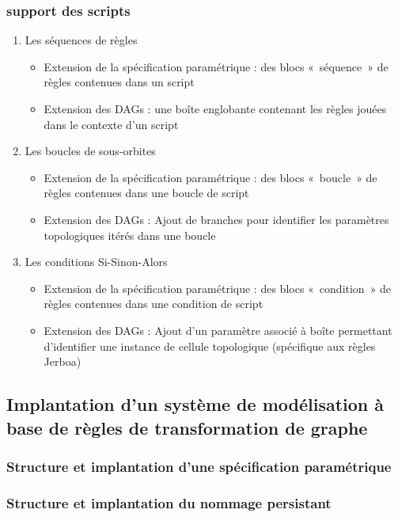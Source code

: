 \documentclass[11pt]{article}
\begin{document}
\subsubsection{support des scripts}
\label{sec:orgcc5b6ea}
\begin{enumerate}
\item Les séquences de règles
\label{sec:org34ee3bb}
\begin{itemize}
\item Extension de la spécification paramétrique : des blocs « séquence » de règles contenues dans un script
\item Extension des DAGs : une boîte englobante contenant les règles jouées dans le contexte d'un script
\end{itemize}
\item Les boucles de sous-orbites
\label{sec:org19594ec}
\begin{itemize}
\item Extension de la spécification paramétrique : des blocs « boucle » de règles contenues dans une boucle de script
\item Extension des DAGs : Ajout de branches pour identifier les paramètres topologiques itérés dans une boucle
\end{itemize}
\item Les conditions Si-Sinon-Alors
\label{sec:org08bc9aa}
\begin{itemize}
\item Extension de la spécification paramétrique : des blocs « condition » de règles contenues dans une condition de script
\item Extension des DAGs : Ajout d'un paramètre associé à boîte permettant d'identifier une instance de cellule topologique (spécifique aux règles Jerboa)
\end{itemize}
\end{enumerate}
\subsection{Implantation d'un système de modélisation à base de règles de transformation de graphe}
\label{sec:orga1fe187}
\subsubsection{Structure et implantation d'une spécification paramétrique}
\label{sec:org8762ecd}
\subsubsection{Structure et implantation du nommage persistant}
\label{sec:org093133a}
\end{document}
